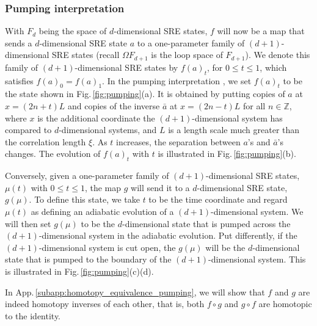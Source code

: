 \documentclass[sort&compress]{elsarticle}
\theoremstyle{theoremstyle}
\theoremstyle{framedtheoremstyle}
\theoremstyle{definitionstyle}
\theoremstyle{definitionstyle}
\theoremstyle{definitionstyle}
\theoremstyle{definitionstyle}
\theoremstyle{nameddefinitionstyle}
\theoremstyle{framednameddefinitionstyle}
\theoremstyle{proofstyle}
\theoremstyle{definitionstyle}
\newcommand{\ZZZ}{\mathbb{Z}}
\begin{document}

\subsubsection{Pumping interpretation\label{subsubsec:pumping}}

With $F_d$ being the space of $d$-dimensional SRE states, $f$ will now be a map that sends a $d$-dimensional SRE state $a$ to a one-parameter family of $(d+1)$-dimensional SRE states (recall $\Omega F_{d+1}$ is the loop space of $F_{d+1}$). We denote this family of $(d+1)$-dimensional SRE states by $f(a)_t$, for $0 \leq t \leq 1$, which satisfies $f(a)_0 = f(a)_1$. In the pumping interpretation \cite{Kitaev_Stony_Brook_2011_SRE_1, Kitaev_Stony_Brook_2013_SRE}, we set $f(a)_t$ to be the state shown in Fig.\,\ref{fig:pumping}(a). It is obtained by putting copies of $a$ at $x = (2n+t)L$ and copies of the inverse $\bar a$ at $x = (2n-t)L$ for all $n\in \ZZZ$, where $x$ is the additional coordinate the $(d+1)$-dimensional system has compared to $d$-dimensional systems, and $L$ is a length scale much greater than the correlation length $\xi$. As $t$ increases, the separation between $a$'s and $\bar a$'s changes. The evolution of $f(a)_t$ with $t$ is illustrated in Fig.\,\ref{fig:pumping}(b).

Conversely, given a one-parameter family of $(d+1)$-dimensional SRE states, $\mu(t)$ with $0\leq t \leq 1$, the map $g$ will send it to a $d$-dimensional SRE state, $g(\mu)$. To define this state, we take $t$ to be the time coordinate and regard $\mu(t)$ as defining an adiabatic evolution of a $(d+1)$-dimensional system. We will then set $g(\mu)$ to be the $d$-dimensional state that is pumped across the $(d+1)$-dimensional system in the adiabatic evolution. Put differently, if the $(d+1)$-dimensional system is cut open, the $g(\mu)$ will be the $d$-dimensional state that is pumped to the boundary of the $(d+1)$-dimensional system. This is illustrated in Fig.\,\ref{fig:pumping}(c)(d).

In App.\,\ref{subapp:homotopy_equivalence_pumping}, we will show that $f$ and $g$ are indeed homotopy inverses of each other, that is, both $f\circ g$ and $g \circ f$ are homotopic to the identity.
\end{document}
